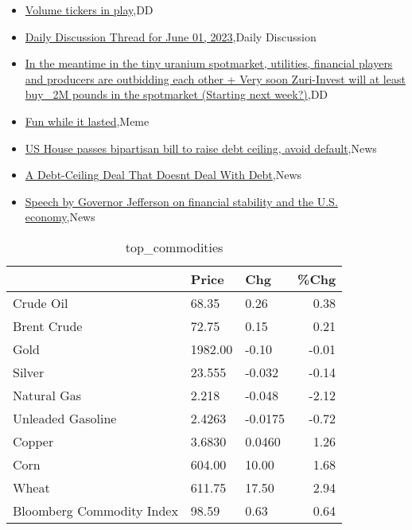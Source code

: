 \documentclass{article}%
\begin{document}
%
\begin{itemize}%
\item%
\href{https://reddit.com/r/wallstreetbets/comments/13xfwb5/volume\_tickers\_in\_play/}{Volume tickers in play},DD%
\item%
\href{https://reddit.com/r/wallstreetbets/comments/13xdhc8/daily\_discussion\_thread\_for\_june\_01\_2023/}{Daily Discussion Thread for June 01, 2023},Daily Discussion%
\item%
\href{https://reddit.com/r/Baystreetbets/comments/13xfnix/in\_the\_meantime\_in\_the\_tiny\_uranium\_spotmarket/}{In the meantime in the tiny uranium spotmarket, utilities, financial players and producers are outbidding each other + Very soon Zuri-Invest will at least buy ~2M pounds in the spotmarket (Starting next week?)},DD%
\item%
\href{https://reddit.com/r/StockMarket/comments/13x85f0/fun\_while\_it\_lasted/}{Fun while it lasted},Meme%
\item%
\href{https://reddit.com/r/Economics/comments/13xdk2g/us\_house\_passes\_bipartisan\_bill\_to\_raise\_debt/}{US House passes bipartisan bill to raise debt ceiling, avoid default},News%
\item%
\href{https://reddit.com/r/Economics/comments/13xd3wo/a\_debtceiling\_deal\_that\_doesnt\_deal\_with\_debt/}{A Debt-Ceiling Deal That Doesnt Deal With Debt},News%
\item%
\href{https://reddit.com/r/Economics/comments/13x4xmh/speech\_by\_governor\_jefferson\_on\_financial/}{Speech by Governor Jefferson on financial stability and the U.S. economy},News%
\end{itemize}%


\begin{table}[htbp]%
\caption{top\_commodities}%
\centering%
\begin{adjustbox}{width=1\textwidth}%
\begin{tabular}{lllr}
\toprule
                          &   Price &     Chg &  \%Chg \\
\midrule
               Crude Oil  &   68.35 &    0.26 &  0.38 \\
             Brent Crude  &   72.75 &    0.15 &  0.21 \\
                    Gold  & 1982.00 &   -0.10 & -0.01 \\
                  Silver  &  23.555 &  -0.032 & -0.14 \\
             Natural Gas  &   2.218 &  -0.048 & -2.12 \\
       Unleaded Gasoline  &  2.4263 & -0.0175 & -0.72 \\
                  Copper  &  3.6830 &  0.0460 &  1.26 \\
                    Corn  &  604.00 &   10.00 &  1.68 \\
                   Wheat  &  611.75 &   17.50 &  2.94 \\
Bloomberg Commodity Index &   98.59 &    0.63 &  0.64 \\
\bottomrule
\end{tabular}
%
\end{adjustbox}%
\end{table}
\end{document}
